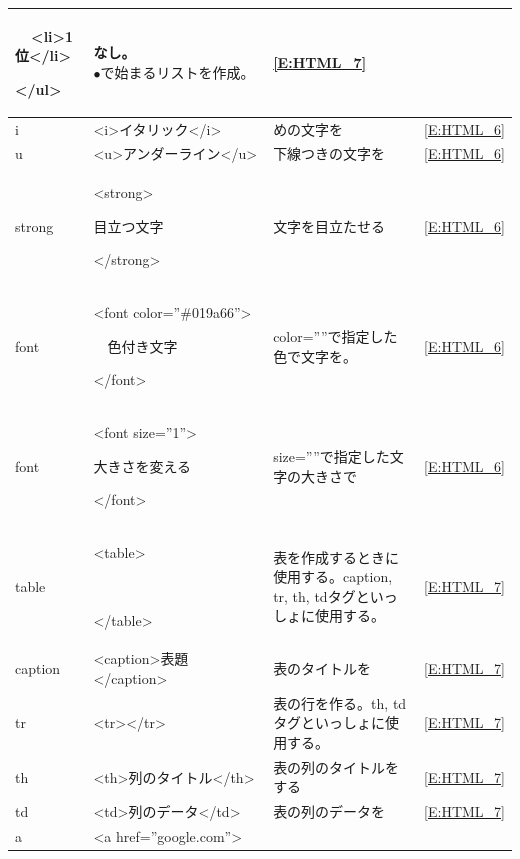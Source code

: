 \documentclass[a4paper,12pt]{jarticle}
\begin{document}
{\begin{center}
\begin{supertabular}{|m{1.6cm}|m{5.1060004cm}|m{7.8930006cm}|m{2.037cm}|}
      \ \ {\textless}li{\textgreater}1位{\textless}/li{\textgreater}

      {\textless}/ul{\textgreater} &
      なし。${\bullet}で始まるリストを作成。$
      &
      \ref*{E:HTML_7}\\\hline
      i &
      {\textless}i{\textgreater}イタリック{\textless}/i{\textgreater} &
      めの文字を &
      \ref*{E:HTML_6}\\\hline
      u &
      {\textless}u{\textgreater}アンダーライン{\textless}/u{\textgreater} &
      下線つきの文字を &
      \ref*{E:HTML_6}\\\hline
      strong &
      {\textless}strong{\textgreater}

      目立つ文字

      {\textless}/strong{\textgreater} &
      文字を目立たせる &
      \ref*{E:HTML_6}\\\hline
      font  &
      {\textless}font color=”\#019a66”{\textgreater}

      \ \ 色付き文字

      {\textless}/font{\textgreater} &
      color=””で指定した色で文字を。 &
      \ref*{E:HTML_6}\\\hline
      font &
      {\textless}font size=”1”{\textgreater}

      大きさを変える

      {\textless}/font{\textgreater} &
      size=””で指定した文字の大きさで &
      \ref*{E:HTML_6}\\\hline
      table &
      {\textless}table{\textgreater}

      ~

      {\textless}/table{\textgreater} &
      表を作成するときに使用する。caption, tr, th,
      tdタグといっしょに使用する。 &
      \ref*{E:HTML_7}\\\hline
      caption &
      {\textless}caption{\textgreater}表題{\textless}/caption{\textgreater} &
      表のタイトルを &
      \ref*{E:HTML_7}\\\hline
      tr &
      {\textless}tr{\textgreater}{\textless}/tr{\textgreater} &
      表の行を作る。th,
      tdタグといっしょに使用する。 &
      \ref*{E:HTML_7}\\\hline
      th &
      {\textless}th{\textgreater}列のタイトル{\textless}/th{\textgreater} &
      表の列のタイトルをする &
      \ref*{E:HTML_7}\\\hline
      td &
      {\textless}td{\textgreater}列のデータ{\textless}/td{\textgreater} &
      表の列のデータを &
      \ref*{E:HTML_7}\\\hline
      a &
      {\textless}a href=”google.com”{\textgreater}


\end{supertabular}
\end{center}}
\end{document}
